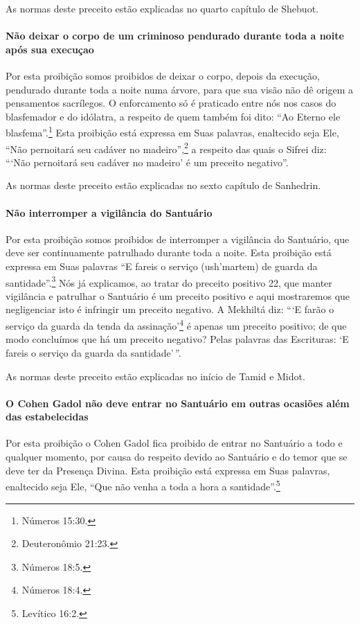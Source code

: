 As normas deste preceito estão explicadas no quarto capítulo de Shebuot.

\paragraph{Não deixar o corpo de um criminoso pendurado durante toda a
noite após sua execuçao}

Por esta proibição somos proibidos de deixar o corpo, depois da
execução, pendurado durante toda a noite numa árvore, para que sua visão
não dê origem a pensamentos sacrílegos. O enforcamento só é praticado
entre nós nos casos do blasfemador e do idólatra, a respeito de quem
também foi dito: ``Ao Eterno ele blasfema''.\footnote{Números 15:30.} Esta proibição está expressa em Suas palavras, enaltecido seja Ele, ``Não pernoitará seu cadáver no
madeiro'',\footnote{Deuteronômio 21:23.} a respeito das quais o Sifrei diz:
```Não pernoitará seu cadáver no madeiro' é um preceito negativo''.

As normas deste preceito estão explicadas no sexto capítulo de Sanhedrin.

\paragraph{Não interromper a vigilância do Santuário}

Por esta proibição somos proibidos de interromper a vigilância do
Santuário, que deve ser continuamente patrulhado durante toda a noite.
Esta proibição está expressa em Suas palavras ``E fareis o serviço
(ush'martem) de guarda da santidade''.\footnote{Números 18:5.} Nós já explicamos,
ao tratar do preceito positivo 22, que manter vigilância e patrulhar o
Santuário é um preceito positivo e aqui mostraremos que negligenciar
isto é infringir um preceito negativo. A Mekhiltá diz: ```E farão o
serviço da guarda da tenda da assinação'\footnote{Números 18:4.} é apenas um
preceito positivo; de que modo concluímos que há um preceito negativo?
Pelas palavras das Escrituras: `E fareis o serviço da guarda da
santidade'\,''.

As normas deste preceito estão explicadas no início de Tamid e Midot.

\paragraph{O Cohen Gadol não deve entrar no Santuário em outras ocasiões além das estabelecidas}

Por esta proibição o Cohen Gadol fica proibido de entrar no
Santuário a todo e qualquer momento, por causa do respeito devido ao
Santuário e do temor que se deve ter da Presença Divina. Esta proibição
está expressa em Suas palavras, enaltecido seja Ele, ``Que não venha a
toda a hora a santidade''.\footnote{Levítico 16:2.}

